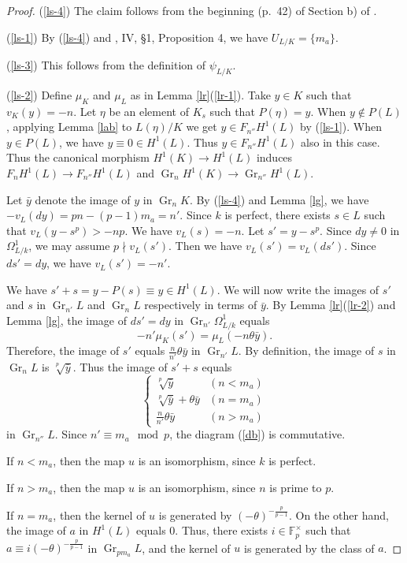 \documentclass[10pt,a4paper]{amsart}
\numberwithin{equation}{section}
\newcommand{\Gr}{\operatorname{Gr}}
\theoremstyle{plain}
\theoremstyle{definition}
\begin{document}
      \begin{proof}
(\ref{ls-4}) The claim follows from the beginning (p.\ 42) of Section b) of \cite{Ha}.
        
        (\ref{ls-1}) By (\ref{ls-4}) and \cite{Se}, IV, \S 1, Proposition 4, we have $U_{L/K}=\{m_a\}$.

(\ref{ls-3}) This follows from the definition of $\psi_{L/K}$.
        
        (\ref{ls-2}) Define $\mu_{K}$ and $\mu_{L}$ as in Lemma \ref{lr}(\ref{lr-1}). Take $y\in K$ such that $v_K(y)=-n$. Let $\eta$ be an element of $K_s$ such that $P(\eta)=y$. When $y\notin P(L)$, applying Lemma \ref{lab} to $L(\eta)/K$ we get $y\in F_{n''}H^1(L)$ by (\ref{ls-1}). When $y\in P(L)$, we have $y\equiv 0\in H^1(L)$. Thus $y\in F_{n''}H^1(L)$ also in this case. Thus the canonical morphism $H^1(K)\to H^1(L)$ induces $F_nH^1(L)\to F_{n''}H^1(L)$ and $\Gr_nH^1(K)\to \Gr_{n''}H^1(L)$.

         Let $\bar{y}$ denote the image of $y$ in $\Gr_nK$. By (\ref{ls-4}) and Lemma \ref{lg}, we have $-v_L(dy)=pn-(p-1)m_a=n'$. Since $k$ is perfect, there exists $s\in L$ such that $v_L(y-s^p)>-np$. We have $v_L(s)=-n$. Let ${s'}=y-s^p$. Since $dy\neq 0$ in $\Omega_{L/k}^1$, we may assume $p\nmid v_L({s'})$. Then we have $v_L({s'})=v_L(d{s'})$. Since $d{s'}=dy$, we have $v_L({s'})=-n'$.

        We have ${s'}+s=y-P(s)\equiv y\in H^1(L)$. We will now write the images of ${s'}$ and $s$ in $\Gr_{n'}L$ and $\Gr_nL$ respectively in terms of $\bar{y}$. By Lemma \ref{lr}(\ref{lr-2}) and Lemma \ref{lg}, the image of $d{s'}=dy$ in $\Gr_{n'}\Omega_{L/k}^1$ equals
        \begin{equation}
        -n'\mu_{K}({s'})=\mu_{L}(-n\theta\bar{y}).
        \end{equation}
        Therefore, the image of ${s'}$ equals $\displaystyle{\frac{n}{n'}\theta\bar{y}}$ in $\Gr_{n'}L$. By definition, the image of $s$ in $\Gr_nL$ is $\sqrt[p]{\bar{y}}$.
Thus the image of ${s'}+s$ equals
  \begin{equation}
  \left\{\begin{array}{ll}
        \sqrt[p]{\bar{y}}&(n<m_a)\\
        \sqrt[p]{\bar{y}}+\theta\bar{y}&(n=m_a)\\
        \frac{n}{n'}\theta\bar{y}&(n>m_a)
      \end{array}\right.
  \end{equation}
  in $\Gr_{n''}L$. Since $n'\equiv m_a\mod p$, the diagram (\ref{db}) is commutative.

  If $n<m_a$, then the map $u$ is an isomorphism, since $k$ is perfect.

  If $n>m_a$, then the map $u$ is an isomorphism, since $n$ is prime to $p$.

  If $n=m_a$, then the kernel of $u$ is generated by $(-\theta)^{-\frac{p}{p-1}}$. On the other hand, the image of $a$ in $H^1(L)$ equals 0. Thus, there exists $i\in\mathbb{F}_p^\times$ such that $a\equiv i(-\theta)^{-\frac{p}{p-1}}$ in $\Gr_{pm_a}L$, and the kernel of $u$ is generated by the class of $a$.
\end{proof}
\end{document}

